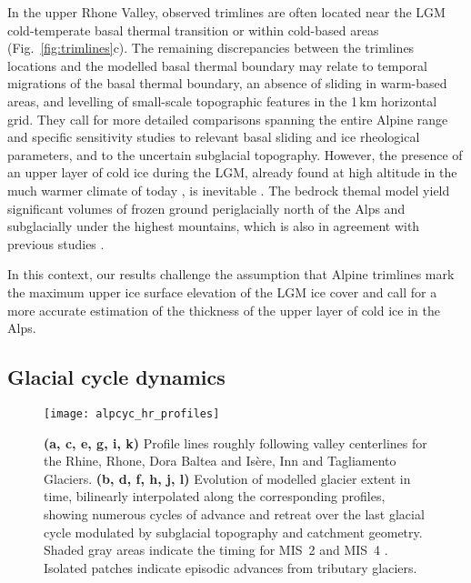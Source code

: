 \documentclass[tc, manuscript]{copernicus}
\begin{document}
    In the upper Rhone Valley, observed trimlines are often located near the
    LGM cold-temperate basal thermal transition or within cold-based areas
    (Fig.~\ref{fig:trimlines}c). The remaining discrepancies between the
    trimlines locations and the modelled basal thermal boundary may relate to
    temporal migrations of the basal thermal boundary, an absence of sliding in
    warm-based areas, and levelling of small-scale topographic features in the
    1\,km horizontal grid. They call for more detailed comparisons
    spanning the entire Alpine range and specific sensitivity studies to
    relevant basal sliding and ice rheological parameters, and to the uncertain
    subglacial topography. However, the presence of an upper layer of
    cold ice during the LGM, already found at high altitude in the much warmer
    climate of today \citep[e.g.,][]{Suter.etal.2001, Bohleber.etal.2017}, is
    inevitable \citep{Blatter.Haeberli.1984, Haeberli.Schluchter.1987,
    Cohen.etal.2017}. The bedrock themal model yield significant volumes of
    frozen ground periglacially north of the Alps and subglacially under the
    highest mountains, which is also in agreement with previous studies
    \citep{Haeberli.etal.1984, Lindgren.etal.2016, Cohen.etal.2017}.

    In this context, our results challenge the assumption that
    Alpine trimlines mark the maximum upper ice surface elevation of the LGM
    ice cover and call for a more accurate estimation of the thickness of the
    upper layer of cold ice in the Alps.


\subsection{Glacial cycle dynamics}
\label{sec:glaciations}

    \begin{figure*}[t]
      \centerline{\texttt{[image: alpcyc\_hr\_profiles]}}
      \caption{%
        \textbf{(a, c, e, g, i, k)} Profile lines roughly following valley
        centerlines for the Rhine, Rhone, Dora Baltea and Isère, Inn and
        Tagliamento Glaciers.
        \textbf{(b, d, f, h, j, l)} Evolution of modelled glacier extent in
        time, bilinearly interpolated along the corresponding profiles, showing
        numerous cycles of advance and retreat over the last glacial cycle
        modulated by subglacial topography and catchment geometry. Shaded gray
        areas indicate the timing for MIS~2 and MIS~4
        \citep{Lisiecki.Raymo.2005}. Isolated patches indicate episodic
        advances from tributary glaciers.}
      \label{fig:profiles}
    \end{figure*}
\end{document}
